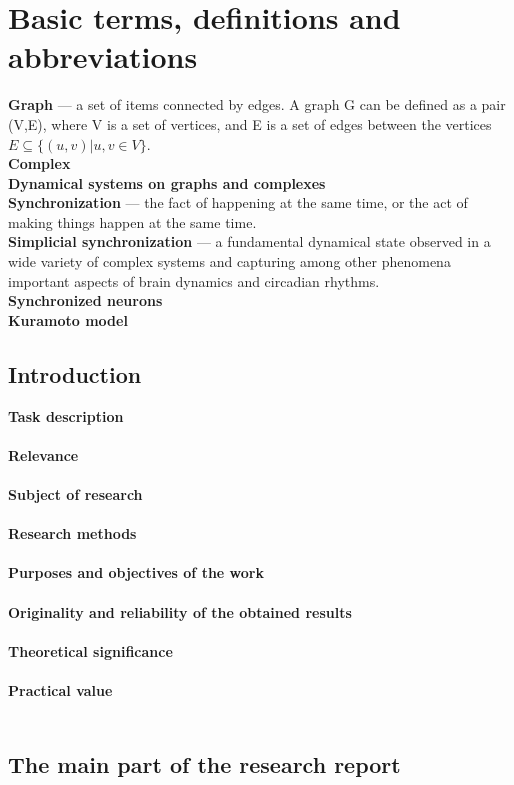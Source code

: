 \documentclass[draft]{article}
\begin{document}
\section {Basic terms, definitions and abbreviations}
\textbf{Graph} — a set of items connected by edges. A graph G can be defined as a pair (V,E), where V is a set of vertices, and E is a set of edges between the vertices  $E \subseteq \{(u,v) | u, v \in V\}$\cite{litlink1}.\\
\textbf{Complex}\\
\textbf{Dynamical systems on graphs and complexes}\\
\textbf{Synchronization} — the fact of happening at the same time, or the act of making things happen at the same time\cite{litlink2}.\\
\textbf{Simplicial synchronization} — a fundamental dynamical state observed in a wide variety of complex systems and capturing among other phenomena important aspects of brain dynamics and circadian rhythms\cite{litlink3}.\\
\textbf{Synchronized neurons}\\
\textbf{Kuramoto model}\\
\newpage
\begin{center}
\item\section {Introduction}
\end{center}
\textbf{Task description}\\
~\\
\textbf{Relevance}\\
~\\
\textbf{Subject of research}\\
~\\
\textbf{Research methods}\\
~\\
\textbf{Purposes and objectives of the work}\\
~\\
\textbf{Originality and reliability of the obtained results}\\
~\\
\textbf{Theoretical significance}\\
~\\
\textbf{Practical value}\\
~\\
\newpage
\begin{center}
\section {The main part of the research report}
\end{center}
\end{document}
